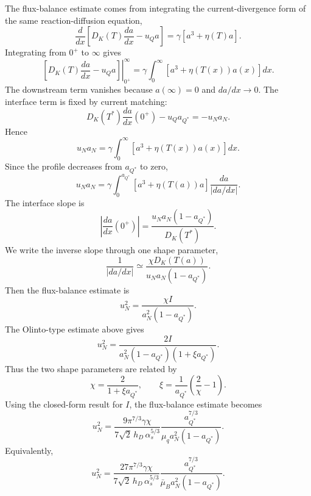 \documentclass[11pt]{article}
\begin{document}
The flux-balance estimate comes from integrating the current-divergence form of
the same reaction-diffusion equation,
\begin{equation}
\frac{d}{dx}
\left[
D_K(T)\frac{da}{dx}-u_Qa
\right]
=
\gamma\left[a^3+\eta(T)a\right].
\end{equation}
Integrating from \(0^+\) to \(\infty\) gives
\begin{equation}
\left.
\left[
D_K(T)\frac{da}{dx}-u_Qa
\right]\right|_{0^+}^{\infty}
=
\gamma\int_0^\infty
\left[a^3+\eta(T(x))a(x)\right]dx .
\end{equation}
The downstream term vanishes because \(a(\infty)=0\) and \(da/dx\to0\).
The interface term is fixed by current matching:
\begin{equation}
D_K(T^*)\frac{da}{dx}(0^+)-u_Qa_{Q^*}=-u_Na_N .
\end{equation}
Hence
\begin{equation}
u_Na_N
=
\gamma\int_0^\infty
\left[a^3+\eta(T(x))a(x)\right]dx .
\end{equation}
Since the profile decreases from \(a_{Q^*}\) to zero,
\begin{equation}
u_Na_N
=
\gamma
\int_0^{a_{Q^*}}
\left[a^3+\eta(T(a))a\right]\frac{da}{|da/dx|}.
\end{equation}
The interface slope is
\begin{equation}
\left|\frac{da}{dx}(0^+)\right|
=
\frac{u_Na_N(1-a_{Q^*})}{D_K(T^*)}.
\end{equation}
We write the inverse slope through one shape parameter,
\begin{equation}
\frac{1}{|da/dx|}
\simeq
\frac{\chi D_K(T(a))}{u_Na_N(1-a_{Q^*})}.
\end{equation}
Then the flux-balance estimate is
\begin{equation}
u_N^2
=
\frac{\chi I}{a_N^2(1-a_{Q^*})}.
\end{equation}
The Olinto-type estimate above gives
\begin{equation}
u_N^2
=
\frac{2I}
{a_N^2(1-a_{Q^*})(1+\xi a_{Q^*})}.
\end{equation}
Thus the two shape parameters are related by
\begin{equation}
\chi=\frac{2}{1+\xi a_{Q^*}},
\qquad
\xi=\frac{1}{a_{Q^*}}\left(\frac{2}{\chi}-1\right).
\end{equation}
Using the closed-form result for \(I\), the flux-balance estimate becomes
\begin{equation}
u_N^2
=
\frac{
9\pi^{7/3}\gamma\chi
}{
7\sqrt{2}\,h_D\,\alpha_s^{5/3}
}
\frac{
a_{Q^*}^{7/3}
}{
\mu_q a_N^2(1-a_{Q^*})
}.
\end{equation}
Equivalently,
\begin{equation}
u_N^2
=
\frac{
27\pi^{7/3}\gamma\chi
}{
7\sqrt{2}\,h_D\,\alpha_s^{5/3}
}
\frac{
a_{Q^*}^{7/3}
}{
\bar\mu_B a_N^2(1-a_{Q^*})
}.
\end{equation}
\fi
\end{document}
